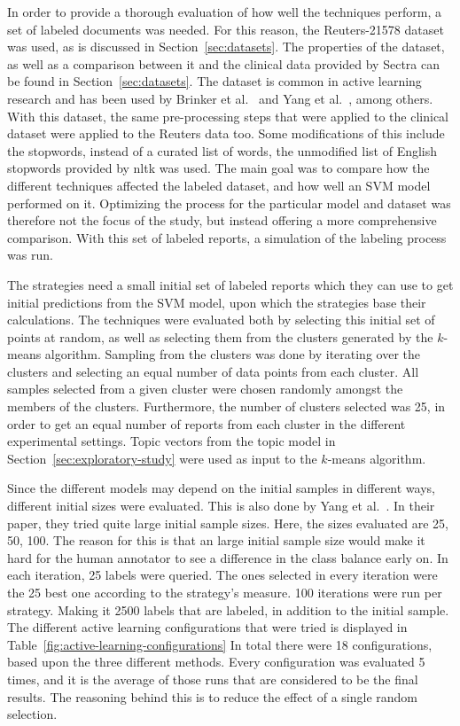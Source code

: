 In order to provide a thorough evaluation of how well the techniques perform, a set of labeled documents was needed.
For this reason, the Reuters-21578 dataset was used, as is discussed in Section~\ref{sec:datasets}. 
The properties of the dataset, as well as a comparison between it and the clinical data provided by Sectra can be found in Section~\ref{sec:datasets}.
The dataset is common in active learning research and has been used by Brinker et al\@.~\cite{brinker2006active} and Yang et al\@.~\cite{yang2009effective}, among others.
With this dataset, the same pre-processing steps that were applied to the clinical dataset were applied to the Reuters data too.
Some modifications of this include the stopwords, instead of a curated list of words, the unmodified list of English stopwords provided by nltk was used.
The main goal was to compare how the different techniques affected the labeled dataset, and how well an SVM model performed on it.
Optimizing the process for the particular model and dataset was therefore not the focus of the study, but instead offering a more comprehensive comparison.
With this set of labeled reports, a simulation of the labeling process was run.

The strategies need a small initial set of labeled reports which they can use to get initial predictions from the SVM model, upon which the strategies base their calculations.
The techniques were evaluated both by selecting this initial set of points at random, as well as selecting them from the clusters generated by the $k$-means algorithm.
Sampling from the clusters was done by iterating over the clusters and selecting an equal number of data points from each cluster.
All samples selected from a given cluster were chosen randomly amongst the members of the clusters.
Furthermore, the number of clusters selected was 25, in order to get an equal number of reports from each cluster in the different experimental settings.
Topic vectors from the topic model in Section~\ref{sec:exploratory-study} were used as input to the $k$-means algorithm.

Since the different models may depend on the initial samples in different ways, different initial sizes were evaluated.
This is also done by Yang et al\@.~\cite{yang2009effective}.
In their paper, they tried quite large initial sample sizes.
Here, the sizes evaluated are 25, 50, 100.
The reason for this is that an large initial sample size would make it hard for the human annotator to see a difference in the class balance early on.
In each iteration, 25 labels were queried.
The ones selected in every iteration were the 25 best one according to the strategy's measure.
100 iterations were run per strategy.
Making it 2500 labels that are labeled, in addition to the initial sample.
The different active learning configurations that were tried is displayed in Table~\ref{fig:active-learning-configurations}
In total there were 18 configurations, based upon the three different methods.
Every configuration was evaluated 5 times, and it is the average of those runs that are considered to be the final results.
The reasoning behind this is to reduce the effect of a single random selection.

